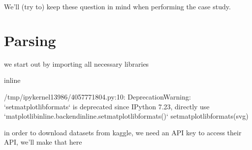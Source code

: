 \documentclass[letterpaper,10pt,english]{jupyterBook}
\begin{document}
\sphinxAtStartPar
We’ll (try to) keep these question in mind when performing the case study.


\section{Parsing}
\label{\detokenize{c7_case_studies/UserSurvey:parsing}}
\sphinxAtStartPar
we start out by importing all necessary libraries

\begin{sphinxVerbatim}[commandchars=\\\{\}]
 
 
   
   
   
 
   
   
 inline
\end{sphinxVerbatim}

\begin{sphinxVerbatim}[commandchars=\\\{\}]
/tmp/ipykernel\PYGZus{}13986/4057771804.py:10: DeprecationWarning: `set\PYGZus{}matplotlib\PYGZus{}formats` is deprecated since IPython 7.23, directly use `matplotlib\PYGZus{}inline.backend\PYGZus{}inline.set\PYGZus{}matplotlib\PYGZus{}formats()`
  set\PYGZus{}matplotlib\PYGZus{}formats(\PYGZsq{}svg\PYGZsq{})
\end{sphinxVerbatim}

\sphinxAtStartPar
in order to download datasets from kaggle, we need an API key to access their API, we’ll make that here
\end{document}
